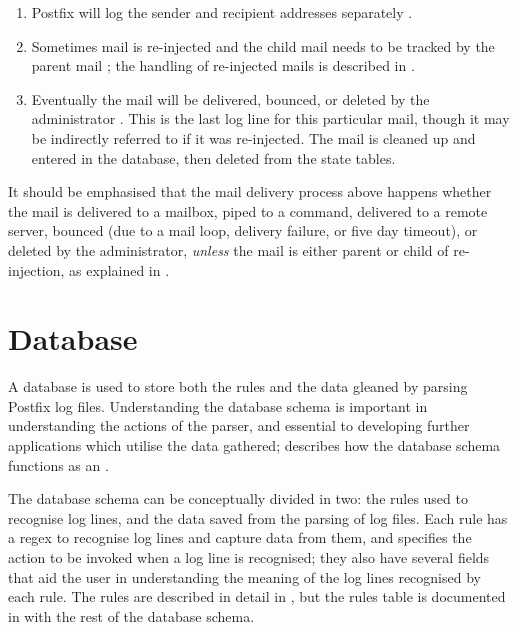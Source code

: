 \begin{enumerate}

    \item Postfix will log the sender and recipient addresses separately
        .

    \item Sometimes mail is re-injected and the child mail needs to be
        tracked by the parent mail ; the handling of
        re-injected mails is described in .

    \item Eventually the mail will be delivered, bounced, or deleted by the
        administrator .  This is the last log line
        for this particular mail, though it may be indirectly referred to
        if it was re-injected.  The mail is cleaned up and entered in the
        database, then deleted from the state tables.

\end{enumerate}

It should be emphasised that the mail delivery process above happens
whether the mail is delivered to a mailbox, piped to a command, delivered
to a remote server, bounced (due to a mail loop, delivery failure, or five
day timeout), or deleted by the administrator, \textit{unless\/} the mail
is either parent or child of re-injection, as explained in
.

\section{Database}

\label{database}

A database is used to store both the rules and the data gleaned by parsing
Postfix log files.  Understanding the database schema is important in
understanding the actions of the parser, and essential to developing
further applications which utilise the data gathered;  describes how the database schema functions as an .

The database schema can be conceptually divided in two: the rules used to
recognise log lines, and the data saved from the parsing of log files.
Each rule has a regex to recognise log lines and capture data from them,
and specifies the action to be invoked when a log line is recognised; they
also have several fields that aid the user in understanding the meaning of
the log lines recognised by each rule.  The rules are described in detail
in , but the rules table is documented
in  with the rest of the database schema.

